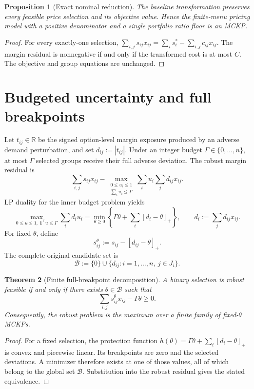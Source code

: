 \documentclass[11pt,a4paper]{article}
\newtheorem{theorem}{Theorem}
\newtheorem{proposition}[theorem]{Proposition}
\theoremstyle{definition}
\theoremstyle{remark}
\newcommand{\R}{\mathbb R}
\newcommand{\B}{\mathcal B}
\newcommand{\pos}[1]{[#1]_+}
\begin{document}
\begin{proposition}[Exact nominal reduction]
The baseline transformation preserves every feasible price selection and its
objective value. Hence the finite-menu pricing model with a positive
denominator and a single portfolio ratio floor is an MCKP.
\end{proposition}

\begin{proof}
For every exactly-one selection,
$\sum_{i,j}s_{ij}x_{ij}=\sum_i s_i^*-\sum_{i,j}c_{ij}x_{ij}$.
The margin residual is nonnegative if and only if the transformed cost is at
most $C$. The objective and group equations are unchanged.
\end{proof}

\section{Budgeted uncertainty and full breakpoints}

Let $t_{ij}\in\R$ be the signed option-level margin exposure produced by an
adverse demand perturbation, and set $d_{ij}:=|t_{ij}|$. Under an integer
budget $\Gamma\in\{0,\ldots,n\}$, at most $\Gamma$ selected groups receive
their full adverse deviation. The robust margin residual is
\[
  \sum_{i,j}s_{ij}x_{ij}
  -\max_{\substack{0\le u_i\le1\\\sum_i u_i\le\Gamma}}
    \sum_i u_i\sum_jd_{ij}x_{ij}.
\]
LP duality for the inner budget problem yields
\[
 \max_{0\le u\le1,\ \mathbf 1^\top u\le\Gamma}\sum_i d_i u_i
 =\min_{\theta\ge0}
   \left\{\Gamma\theta+\sum_i\pos{d_i-\theta}\right\},
 \qquad d_i:=\sum_jd_{ij}x_{ij}.
\]
For fixed $\theta$, define
\[
  s_{ij}^{\theta}:=s_{ij}-\pos{d_{ij}-\theta}.
\]
The complete original candidate set is
\[
  \B:=\{0\}\cup\{d_{ij}:i=1,\ldots,n,\ j\in J_i\}.
\]

\begin{theorem}[Finite full-breakpoint decomposition]
A binary selection is robust feasible if and only if there exists
$\theta\in\B$ such that
\[
  \sum_{i,j}s_{ij}^{\theta}x_{ij}-\Gamma\theta\ge0.
\]
Consequently, the robust problem is the maximum over a finite family of
fixed-$\theta$ MCKPs.
\end{theorem}

\begin{proof}
For a fixed selection, the protection function
$h(\theta)=\Gamma\theta+\sum_i\pos{d_i-\theta}$ is convex and piecewise linear.
Its breakpoints are zero and the selected deviations. A minimizer therefore
exists at one of those values, all of which belong to the global set $\B$.
Substitution into the robust residual gives the stated equivalence.
\end{proof}
\end{document}
